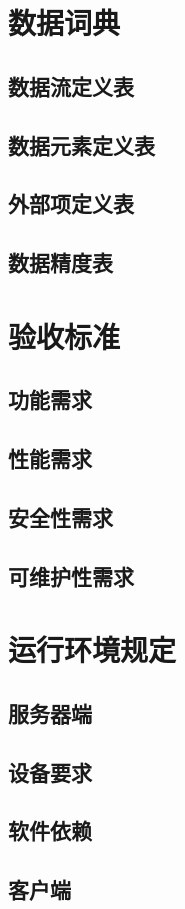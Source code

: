 \documentclass{ctexart}
\begin{document}
\section{数据词典}

\subsection{数据流定义表}

\subsection{数据元素定义表}

\subsection{外部项定义表}

\subsection{数据精度表}

\section{验收标准}

\subsection{功能需求}

\subsection{性能需求}

\subsection{安全性需求}

\subsection{可维护性需求}

\section{运行环境规定}

\subsection{服务器端}

\subsection{设备要求}

\subsection{软件依赖}

\subsection{客户端}
\end{document}
